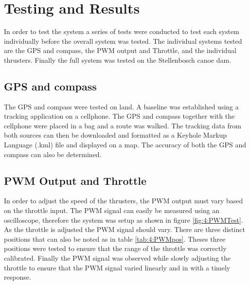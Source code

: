 \chapter{Testing and Results}
In order to test the system a series of tests were conducted to test each system individually before the overall system was tested. The individual systems tested are the GPS and compass, the PWM output and Throttle, and the individual thrusters. Finally the full system was tested on the Stellenbosch canoe dam. 
\section{GPS and compass}
The GPS and compass were tested on land. A baseline was established using a tracking application on a cellphone. The GPS and compass together with the cellphone were placed in a bag and a route was walked. The tracking data from both sources can then be downloaded and formatted as a Keyhole Markup Language (.kml) file and displayed on a map. The accuracy of both the GPS and compass can also be determined. 
\section{PWM Output and Throttle}
In order to adjust the speed of the thrusters, the PWM output must vary based on the throttle input. The PWM signal can easily be measured using an oscilloscope, therefore the system was setup as shown in figure \ref{fig:4:PWMTest}. As the throttle is adjusted the PWM signal should vary. There are three distinct positions that can also be noted as in table \ref{tab:4:PWMpos}. Theses three positions were tested to ensure that the range of the throttle was correctly calibrated. Finally the PWM signal was observed while slowly adjusting the throttle to ensure that the PWM signal varied linearly and in with a timely response. 